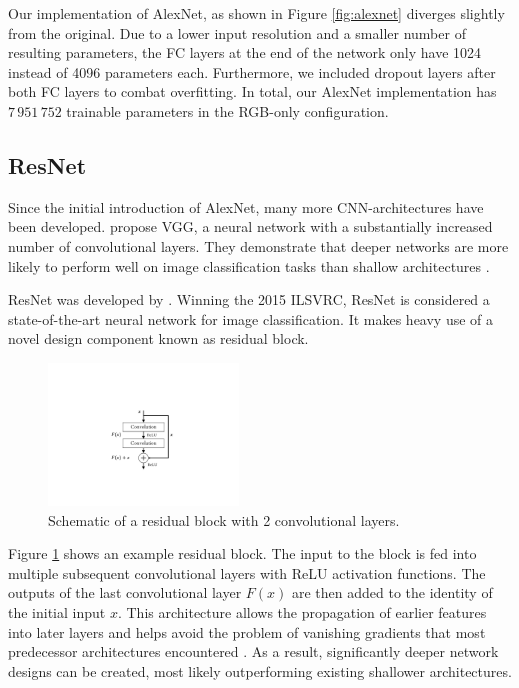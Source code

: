 \documentclass{l4proj}
\begin{document}
Our implementation of AlexNet, as shown in Figure \ref{fig:alexnet} diverges slightly from the original. Due to a lower input resolution and a smaller number of resulting parameters, the FC layers at the end of the network only have 1024 instead of 4096 parameters each. Furthermore, we included dropout layers after both FC layers to combat overfitting. In total, our AlexNet implementation has $7\,951\,752$ trainable parameters in the RGB-only configuration.

\subsection{ResNet}

Since the initial introduction of AlexNet, many more CNN-architectures have been developed. \citet{simonyan_very_2015} propose VGG, a neural network with a substantially increased number of convolutional layers. They demonstrate that deeper networks are more likely to perform well on image classification tasks than shallow architectures \citep{alom_history_2018}.

ResNet was developed by \citet{he_deep_2016}. Winning the 2015 ILSVRC, ResNet is considered a state-of-the-art neural network for image classification. It makes heavy use of a novel design component known as residual block. 

\begin{figure}[ht]
  \centering
  \includegraphics[width=0.45\textwidth, trim={7cm 4.8cm 7cm 6cm}, clip]{images/models/res_block}
  \caption{Schematic of a residual block with 2 convolutional layers.}
  \label{fig:res_block}
\end{figure}

Figure \ref{fig:res_block} shows an example residual block. The input to the block is fed into multiple subsequent convolutional layers with ReLU activation functions. The outputs of the last convolutional layer $F(x)$ are then added to the identity of the initial input $x$. This architecture allows the propagation of earlier features into later layers and helps avoid the problem of vanishing gradients that most predecessor architectures encountered \citep{alom_history_2018}. As a result, significantly deeper network designs can be created, most likely outperforming existing shallower architectures.
\end{document}
